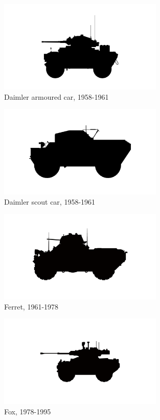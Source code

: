 \begin{figure}[h]
  \centering
  \includegraphics[width=0.7\textwidth]{platforms/daimler-armoured-car.pdf}
  \caption*{Daimler armoured car, 1958-1961}
\end{figure}

\begin{figure}[h]
  \centering
  \includegraphics[width=0.7\textwidth]{platforms/daimler-scout.pdf}
  \caption*{Daimler scout car, 1958-1961}
\end{figure}

\begin{figure}[h]
  \centering
  \includegraphics[width=0.7\textwidth]{platforms/ferret.pdf}
  \caption*{Ferret, 1961-1978}
\end{figure}

\begin{figure}[h]
  \centering
  \includegraphics[width=0.7\textwidth]{platforms/fox.pdf}
  \caption*{Fox, 1978-1995}
\end{figure}

